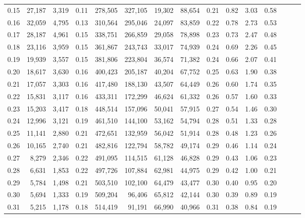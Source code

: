 \begin{tabular}{rrrrrrrrrrrrrrr}
0.15 &  27,187 &  3,319 &  0.11 &  278,505 &  327,105 &   19,302 &   88,654 &  0.21 &  0.82 &  3.03 &      0.58 \\
0.16 &  32,059 &  4,795 &  0.13 &  310,564 &  295,046 &   24,097 &   83,859 &  0.22 &  0.78 &  2.73 &      0.53 \\
0.17 &  28,187 &  4,961 &  0.15 &  338,751 &  266,859 &   29,058 &   78,898 &  0.23 &  0.73 &  2.47 &      0.48 \\
0.18 &  23,116 &  3,959 &  0.15 &  361,867 &  243,743 &   33,017 &   74,939 &  0.24 &  0.69 &  2.26 &      0.45 \\
0.19 &  19,939 &  3,557 &  0.15 &  381,806 &  223,804 &   36,574 &   71,382 &  0.24 &  0.66 &  2.07 &      0.41 \\
0.20 &  18,617 &  3,630 &  0.16 &  400,423 &  205,187 &   40,204 &   67,752 &  0.25 &  0.63 &  1.90 &      0.38 \\
0.21 &  17,057 &  3,303 &  0.16 &  417,480 &  188,130 &   43,507 &   64,449 &  0.26 &  0.60 &  1.74 &      0.35 \\
0.22 &  15,831 &  3,117 &  0.16 &  433,311 &  172,299 &   46,624 &   61,332 &  0.26 &  0.57 &  1.60 &      0.33 \\
0.23 &  15,203 &  3,417 &  0.18 &  448,514 &  157,096 &   50,041 &   57,915 &  0.27 &  0.54 &  1.46 &      0.30 \\
0.24 &  12,996 &  3,121 &  0.19 &  461,510 &  144,100 &   53,162 &   54,794 &  0.28 &  0.51 &  1.33 &      0.28 \\
0.25 &  11,141 &  2,880 &  0.21 &  472,651 &  132,959 &   56,042 &   51,914 &  0.28 &  0.48 &  1.23 &      0.26 \\
0.26 &  10,165 &  2,740 &  0.21 &  482,816 &  122,794 &   58,782 &   49,174 &  0.29 &  0.46 &  1.14 &      0.24 \\
0.27 &   8,279 &  2,346 &  0.22 &  491,095 &  114,515 &   61,128 &   46,828 &  0.29 &  0.43 &  1.06 &      0.23 \\
0.28 &   6,631 &  1,853 &  0.22 &  497,726 &  107,884 &   62,981 &   44,975 &  0.29 &  0.42 &  1.00 &      0.21 \\
0.29 &   5,784 &  1,498 &  0.21 &  503,510 &  102,100 &   64,479 &   43,477 &  0.30 &  0.40 &  0.95 &      0.20 \\
0.30 &   5,694 &  1,333 &  0.19 &  509,204 &   96,406 &   65,812 &   42,144 &  0.30 &  0.39 &  0.89 &      0.19 \\
0.31 &   5,215 &  1,178 &  0.18 &  514,419 &   91,191 &   66,990 &   40,966 &  0.31 &  0.38 &  0.84 &      0.19 \\

\end{tabular}
